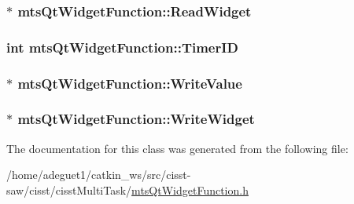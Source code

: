 \hypertarget{classmts_qt_widget_function_a333d0068c3806b9f53ce88c951b5269b}{
\subsubsection[{Read\-Widget}]{$\ast$ mts\-Qt\-Widget\-Function\-::\-Read\-Widget\hspace{0.3cm}{\ttfamily [protected]}}}\label{classmts_qt_widget_function_a333d0068c3806b9f53ce88c951b5269b}
\hypertarget{classmts_qt_widget_function_a9d0fde621a8e282ed207854d6f772a7d}{
\subsubsection[{Timer\-I\-D}]{\setlength{\rightskip}{0pt plus 5cm}int mts\-Qt\-Widget\-Function\-::\-Timer\-I\-D\hspace{0.3cm}{\ttfamily [protected]}}}\label{classmts_qt_widget_function_a9d0fde621a8e282ed207854d6f772a7d}
\hypertarget{classmts_qt_widget_function_a0e56b1cd0270cbbbb914602ace6f1586}{
\subsubsection[{Write\-Value}]{$\ast$ mts\-Qt\-Widget\-Function\-::\-Write\-Value\hspace{0.3cm}{\ttfamily [protected]}}}\label{classmts_qt_widget_function_a0e56b1cd0270cbbbb914602ace6f1586}
\hypertarget{classmts_qt_widget_function_a4601b0dcc1cdf04274dd9d924e5b49c5}{
\subsubsection[{Write\-Widget}]{$\ast$ mts\-Qt\-Widget\-Function\-::\-Write\-Widget\hspace{0.3cm}{\ttfamily [protected]}}}\label{classmts_qt_widget_function_a4601b0dcc1cdf04274dd9d924e5b49c5}


The documentation for this class was generated from the following file\-:\begin{DoxyCompactItemize}
\item 
/home/adeguet1/catkin\-\_\-ws/src/cisst-\/saw/cisst/cisst\-Multi\-Task/\hyperlink{mts_qt_widget_function_8h}{mts\-Qt\-Widget\-Function.\-h}\end{DoxyCompactItemize}
